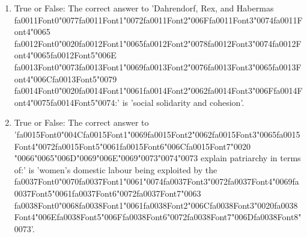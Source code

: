 \documentclass[12pt]{article}
\begin{document}
\begin{enumerate}[label=\arabic*.]
\item True or False: The correct answer to 'Dahrendorf, Rex, and Habermas {\csname fa0011Font0\endcsname\char"0077}{\csname fa0011Font1\endcsname\char"0072}{\csname fa0011Font2\endcsname\char"006F}{\csname fa0011Font3\endcsname\char"0074}{\csname fa0011Font4\endcsname\char"0065} {\csname fa0012Font0\endcsname\char"0020}{\csname fa0012Font1\endcsname\char"0065}{\csname fa0012Font2\endcsname\char"0078}{\csname fa0012Font3\endcsname\char"0074}{\csname fa0012Font4\endcsname\char"0065}{\csname fa0012Font5\endcsname\char"006E} {\csname fa0013Font0\endcsname\char"0073}{\csname fa0013Font1\endcsname\char"0069}{\csname fa0013Font2\endcsname\char"0076}{\csname fa0013Font3\endcsname\char"0065}{\csname fa0013Font4\endcsname\char"006C}{\csname fa0013Font5\endcsname\char"0079} {\csname fa0014Font0\endcsname\char"0020}{\csname fa0014Font1\endcsname\char"0061}{\csname fa0014Font2\endcsname\char"0062}{\csname fa0014Font3\endcsname\char"006F}{\csname fa0014Font4\endcsname\char"0075}{\csname fa0014Font5\endcsname\char"0074}:' is 'social solidarity and cohesion'.
\item True or False: The correct answer to '{\csname fa0015Font0\endcsname\char"004C}{\csname fa0015Font1\endcsname\char"0069}{\csname fa0015Font2\endcsname\char"0062}{\csname fa0015Font3\endcsname\char"0065}{\csname fa0015Font4\endcsname\char"0072}{\csname fa0015Font5\endcsname\char"0061}{\csname fa0015Font6\endcsname\char"006C}{\csname fa0015Font7\endcsname\char"0020} {\char"0066}{\char"0065}{\char"006D}{\char"0069}{\char"006E}{\char"0069}{\char"0073}{\char"0074}{\char"0073} explain patriarchy in terms of:' is 'women's domestic labour being exploited by the {\csname fa0037Font0\endcsname\char"0070}{\csname fa0037Font1\endcsname\char"0061}{\char"0074}{\csname fa0037Font3\endcsname\char"0072}{\csname fa0037Font4\endcsname\char"0069}{\csname fa0037Font5\endcsname\char"0061}{\csname fa0037Font6\endcsname\char"0072}{\csname fa0037Font7\endcsname\char"0063} {\csname fa0038Font0\endcsname\char"0068}{\csname fa0038Font1\endcsname\char"0061}{\csname fa0038Font2\endcsname\char"006C}{\csname fa0038Font3\endcsname\char"0020}{\csname fa0038Font4\endcsname\char"006E}{\csname fa0038Font5\endcsname\char"006F}{\csname fa0038Font6\endcsname\char"0072}{\csname fa0038Font7\endcsname\char"006D}{\csname fa0038Font8\endcsname\char"0073}'.

\end{enumerate}
\end{document}
